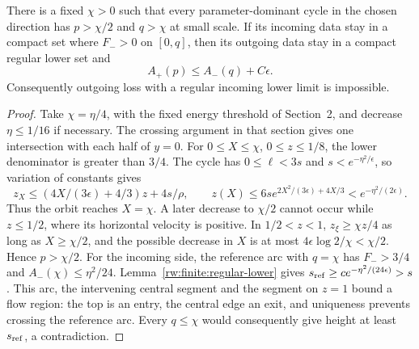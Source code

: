 \begin{lemma}
\label{rw:finite:action-order}
There is a fixed $\chi>0$ such that every parameter-dominant cycle
in the chosen direction has $p>\chi/2$ and $q>\chi$ at small scale.
If its incoming data stay in a compact set where $F_->0$ on $[0,q]$,
then its outgoing data stay in a compact regular lower set and
\begin{equation}\label{rw:finite:action-inequality}
 A_+(p)\le A_-(q)+C\epsilon.
\end{equation}
Consequently outgoing loss with a regular incoming lower limit is
impossible.
\end{lemma}
\begin{proof}
Take $\chi=\eta/4$, with the fixed energy threshold of Section~2,
and decrease $\eta\le1/16$ if necessary. The crossing argument in
that section gives one intersection with each half of $y=0$.
For $0\le X\le\chi$, $0\le z\le1/8$, the lower denominator
is greater than $3/4$. The cycle has $0\le\ell<3s$ and
$s<e^{-\eta^2/\epsilon}$, so variation of constants gives
\[
 z_X\le(4X/(3\epsilon)+4/3)z+4s/\rho,
 \qquad z(X)\le6s e^{2X^2/(3\epsilon)+4X/3}
                  <e^{-\eta^2/(2\epsilon)}.
\]
Thus the orbit reaches $X=\chi$. A later decrease to $\chi/2$
cannot occur while $z\le1/2$, where its horizontal velocity is
positive. In $1/2<z<1$, $z_\xi\ge\chi z/4$ as long as
$X\ge\chi/2$, and the possible decrease in $X$ is at most
$4\epsilon\log2/\chi<\chi/2$. Hence $p>\chi/2$.
For the incoming side, the reference arc with $q=\chi$ has
$F_->3/4$ and $A_-(\chi)\le\eta^2/24$. Lemma~\ref{rw:finite:regular-lower}
gives $s_{\rm ref}\ge c e^{-\eta^2/(24\epsilon)}>s$.
This arc, the intervening central segment and the segment on $z=1$
bound a flow region: the top is an entry, the central edge an exit,
and uniqueness prevents crossing the reference arc. Every $q\le\chi$
would consequently give height at least $s_{\rm ref}$, a contradiction.


\end{proof}
